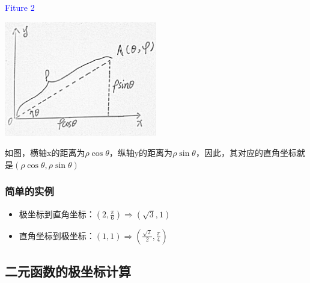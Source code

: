 \documentclass[a4paper]{ctexart}
\begin{document}
\begin{multicols}{2}
\textcolor{blue}{Fiture 2}
\begin{center}
\includegraphics[height=5cm]{lecture7/Figure2.jpg}
\end{center}
\par 如图，横轴x的距离为$\rho\cos{\theta}$，纵轴y的距离为$\rho\sin{\theta}$，因此，其对应的直角坐标就是$(\rho\cos{\theta},\rho\sin{\theta})$

\subsubsection{简单的实例}
\begin{itemize}
  \item 极坐标到直角坐标：$(2, \frac{\pi}{6})\Rightarrow (\sqrt{3}, 1)$
  \item 直角坐标到极坐标：$(1,1) \Rightarrow (\frac{\sqrt{2}}{2}, \frac{\pi}{4})$
\end{itemize}

\subsection{二元函数的极坐标计算}

\end{multicols}
\end{document}
